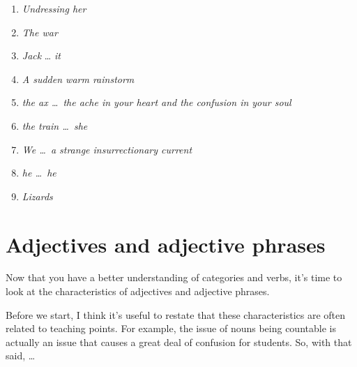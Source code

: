 \newpage
\begin{tcolorbox}[title=Answer key, colback=white]

\begin{enumerate}[noitemsep]
    \item \textit{Undressing her}
    \item \textit{The war}
    \item \textit{Jack} \dots \textit{ it}
    \item \textit{A sudden warm rainstorm}
    \item \textit{the ax \dots~the ache in your heart and the confusion in your soul} 
    \item \textit{the train \dots~she}
    \item \textit{We \dots~a strange insurrectionary current}
    \item \textit{he \dots~he}
    \item \textit{Lizards}
\end{enumerate}
\end{tcolorbox}

\section{Adjectives and adjective phrases}\label{sec:adjs+adjPs}

Now that you have a better understanding of categories and verbs, it's time to look at the characteristics of adjectives and adjective phrases.

Before we start, I think it's useful to restate that these characteristics are often related to teaching points. For example, the issue of nouns being countable is actually an issue that causes a great deal of confusion for students. So, with that said, \dots


